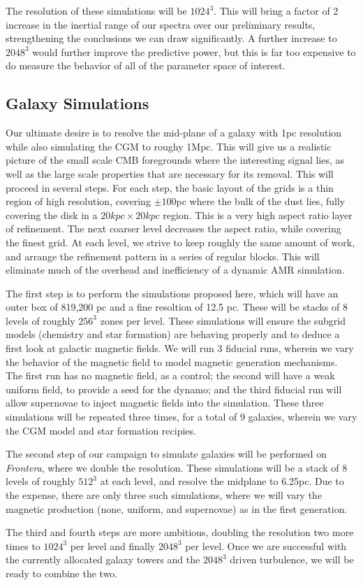 The resolution of these simulations will be $1024^3$.  
This will bring a factor of 2 increase in the inertial range of our spectra over
our preliminary results, strengthening the conclusions we can draw
significantly.  A further increase to $2048^3$ would further improve the
predictive power, but this is far too expensive to do measure the behavior of
all of the parameter space of interest.  

\subsection{Galaxy Simulations}

Our ultimate desire is to resolve the mid-plane of a galaxy with 1pc resolution
while also simulating the CGM to roughy 1Mpc. This will give us a realistic
picture of the small scale CMB foregrounds where the interesting signal lies, as well as the large scale
properties that are necessary for its removal.  This will proceed in several
steps.  For each step, the basic layout of the grids is a thin region of high
resolution, covering $\pm100$pc where the bulk of the dust lies, fully covering
the disk in a $20kpc\times 20kpc$ region.  This is a very high aspect ratio
layer of refinement.  The next coarser level decreases the aspect ratio, while
covering the finest grid.  At each level, we strive to keep roughly the same
amount of work, and arrange the refinement pattern in a series of regular
blocks.  This will eliminate much of the overhead and inefficiency of a dynamic
AMR simulation.  

The first step is to perform the simulations proposed here, which will have an
outer box of 819,200 pc and a fine resoltion of 12.5 pc.  These will be stacks
of 8 levels of roughly $256^3$ zones per level.  These simulations will
ensure the subgrid models (chemistry and star formation) are behaving properly
and to deduce a first look at galactic magnetic fields.  We will run 3 fiducial runs,
wherein we vary the behavior of the magnetic field to model magnetic generation
mechanisms.  The first run has no magnetic field, as a control; the second will
have a weak uniform field, to provide a seed for the dynamo; and the third
fiducial run will allow supernovae to inject magnetic fields into the
simulation.  These three simulations will be repeated three times, for a total of
9 galaxies, wherein we vary the CGM model and star formation recipies.  

The second step of our campaign to simulate galaxies will be performed on
\emph{Frontera}, where we double the resolution. These simulations will be a
stack of 8 levels of roughly $512^3$ at each level, and resolve the midplane to
6.25pc. Due to the expense, there are only three such simulations, where we will
vary the magnetic production (none, uniform, and supernovae) as in the first
generation.

The third and fourth steps are more ambitious, doubling the resolution two more
times to $1024^3$ per level and finally $2048^3$ per level.  Once we are
successful with the currently allocated galaxy towers and the $2048^3$ driven
turbulence, we will be ready to combine the two.  


